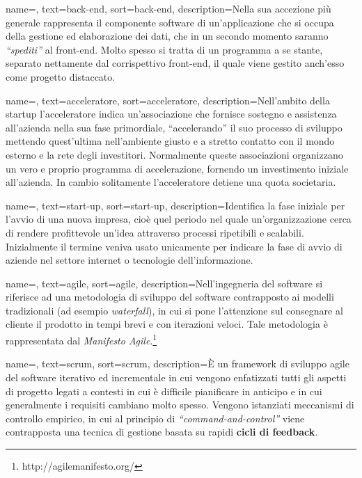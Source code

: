 {
    name=,
    text=back-end,
    sort=back-end,
    description={Nella sua accezione più generale rappresenta il componente software di un'applicazione che si occupa della gestione ed elaborazione dei dati, che in un secondo momento saranno \textit{``spediti''} al front-end. Molto spesso si tratta di un programma a se stante, separato nettamente dal corrispettivo front-end, il quale viene gestito anch'esso come progetto distaccato.}
}

{
    name=,
    text=acceleratore,
    sort=acceleratore,
    description={Nell'ambito della startup l'acceleratore indica un'associazione che fornisce sostegno e assistenza all'azienda nella sua fase primordiale, ``accelerando'' il suo processo di sviluppo mettendo quest'ultima nell'ambiente giusto e a stretto contatto con il mondo esterno e la rete degli investitori. Normalmente queste associazioni organizzano un vero e proprio programma di accelerazione, fornendo un investimento iniziale all'azienda. In cambio solitamente l'acceleratore detiene una quota societaria.}
}

{
    name=,
    text=start-up,
    sort=start-up,
    description={Identifica la fase iniziale per l'avvio di una nuova impresa, cioè quel periodo nel quale un'organizzazione cerca di rendere profittevole un'idea attraverso processi ripetibili e scalabili. Inizialmente il termine veniva usato unicamente per indicare la fase di avvio di aziende nel settore internet o tecnologie dell'informazione.}
}

{
    name=,
    text=agile,
    sort=agile,
    description={Nell'ingegneria del software si riferisce ad una metodologia di sviluppo del software contrapposto ai modelli tradizionali (ad esempio \textit{waterfall}), in cui si pone l'attenzione sul consegnare al cliente il prodotto in tempi brevi e con iterazioni veloci. Tale metodologia è rappresentata dal \textit{Manifesto Agile}.\footnote{http://agilemanifesto.org/}}
}

{
    name=,
    text=scrum,
    sort=scrum,
    description={È un framework di sviluppo agile del software iterativo ed incrementale in cui vengono enfatizzati tutti gli aspetti di progetto legati a contesti in cui è difficile pianificare in anticipo e in cui generalmente i requisiti cambiano molto spesso. Vengono istanziati meccanismi di controllo empirico, in cui al principio di \textit{``command-and-control''} viene contrapposta una tecnica di gestione basata su rapidi \textbf{cicli di feedback}.}
}

